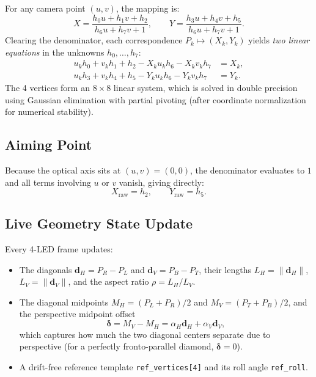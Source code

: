 \documentclass[11pt,a4paper]{article}
\newcommand{\vect}[1]{\mathbf{#1}}
\newcommand{\norm}[1]{\lVert #1 \rVert}
\newcommand{\code}[1]{\texttt{#1}}
\begin{document}
For any camera point $(u,v)$, the mapping is:
\begin{equation}
  X = \frac{h_0 u + h_1 v + h_2}{h_6 u + h_7 v + 1}, \qquad
  Y = \frac{h_3 u + h_4 v + h_5}{h_6 u + h_7 v + 1}.
\end{equation}
Clearing the denominator, each correspondence $P_k \mapsto (X_k,Y_k)$ yields
\emph{two linear equations} in the unknowns $h_0,\dots,h_7$:
\begin{align}
  u_k h_0 + v_k h_1 + h_2 - X_k u_k h_6 - X_k v_k h_7 &= X_k, \\
  u_k h_3 + v_k h_4 + h_5 - Y_k u_k h_6 - Y_k v_k h_7 &= Y_k.
\end{align}
The 4 vertices form an $8\times 8$ linear system, which is solved in double
precision using Gaussian elimination with partial pivoting (after coordinate
normalization for numerical stability).

\subsection{Aiming Point}

Because the optical axis sits at $(u,v) = (0,0)$, the denominator evaluates to
$1$ and all terms involving $u$ or $v$ vanish, giving directly:
\begin{equation}
  X_{\text{raw}} = h_2, \qquad Y_{\text{raw}} = h_5 .
\end{equation}

\subsection{Live Geometry State Update}

Every 4-LED frame updates:
\begin{itemize}[nosep]
  \item The diagonals $\vect{d}_H = P_R - P_L$ and $\vect{d}_V = P_B - P_T$,
        their lengths $L_H = \norm{\vect{d}_H}$, $L_V = \norm{\vect{d}_V}$, and
        the aspect ratio $\rho = L_H / L_V$.
  \item The diagonal midpoints $M_H = (P_L + P_R)/2$ and
        $M_V = (P_T + P_B)/2$, and the perspective midpoint offset
        \begin{equation}
          \boldsymbol{\delta} = M_V - M_H
            = \alpha_H \vect{d}_H + \alpha_V \vect{d}_V ,
        \end{equation}
        which captures how much the two diagonal centers separate due to
        perspective (for a perfectly fronto-parallel diamond,
        $\boldsymbol\delta = 0$).
  \item A drift-free reference template \code{ref\_vertices[4]} and its roll
        angle \code{ref\_roll}.
\end{itemize}
\end{document}
